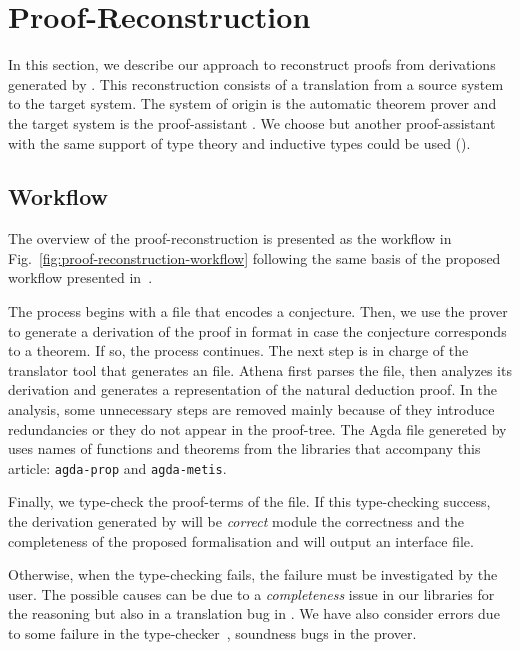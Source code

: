 \documentclass[../main.tex]{subfiles}
\begin{document}

\section{Proof-Reconstruction}
\label{sec:proof-reconstruction}

In this section, we describe our approach to reconstruct proofs from
\CPL derivations generated by \Metis. This reconstruction consists of
a translation from a source system to the target system. The system of
origin is the automatic theorem prover \Metis and the target system is
the proof-assistant \Agda. We choose \Agda but another proof-assistant
with the same support of type theory and inductive types could be used
(\eg \Coq).

\subsection{Workflow}
\label{ssec:workflow}


The overview of the proof-reconstruction is presented as the workflow
in Fig.~\ref{fig:proof-reconstruction-workflow} following the same
basis of the proposed workflow presented in~\cite{sultana2015}.

The process begins with a \TPTP file that encodes a \CPL conjecture.
Then, we use the \Metis prover to generate a derivation of the proof
in \TSTP format in case the \CPL conjecture corresponds to a theorem.
If so, the process continues. The next step is in charge of the
\Athena translator tool that generates an \Agda file.
Athena first parses the \TSTP file, then analyzes its
derivation and generates a representation of the natural deduction
proof. In the \Athena analysis, some unnecessary steps are removed
mainly because of they introduce redundancies or they do not appear in
the proof-tree. The Agda file genereted by \Athena uses names of functions
and theorems from the \Agda libraries that accompany this article:
\texttt{agda-prop} and \texttt{agda-metis}.

Finally, we type-check the proof-terms of the \Agda file.
If this type-checking success, the \TSTP derivation generated by \Metis will be
\emph{correct} module the \Agda correctness and the completeness of the
proposed formalisation and \Agda will output an interface file.

Otherwise, when the type-checking fails, the failure must be
investigated by the user. The possible causes can be due to
a \emph{completeness} issue in our \Agda libraries for the \Metis reasoning
but also in a translation bug in \Athena. We have also consider
errors due to some failure in the type-checker~\Agda,
soundness bugs in the \Metis prover.
\end{document}
